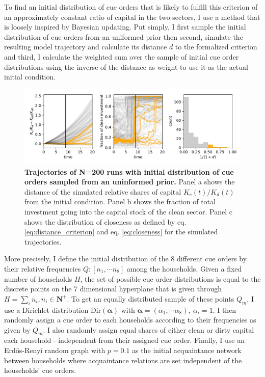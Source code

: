 To find an initial distribution of cue orders that is likely to fulfill this criterion of an approximately constant ratio of capital in the two sectors, I use a method that is loosely inspired by Bayesian updating. Put simply, I first sample the initial distribution of cue orders from an uniformed prior then second, simulate the resulting model trajectory and calculate its distance $d$ to the formalized criterion and third, I calculate the weighted sum over the sample of initial cue order distributions using the inverse of the distance as weight to use it as the actual initial condition.\\


\begin{figure}[t]
  \centering
  \includegraphics[width= \textwidth]{figures/initial_condition_sampling.pdf}
  \caption{\textbf{Trajectories of N=200 runs with initial distribution of cue orders sampled from an uninformed prior.} Panel a shows the distance of the simulated relative shares of capital $K_c(t)/K_d(t)$ from the initial condition. Panel b shows the fraction of total investment going into the capital stock of the clean sector. Panel c shows the distribution of closeness as defined by eq. \ref{eq:distance_criterion} and eq. \ref{eq:closeness} for the simulated trajectories.}
  \label{fig:initial_conditions_sampled}
\end{figure}

More precisely, I define the initial distribution of the 8 different cue orders by their relative frequencies $Q: [n_1, \cdots n_8]$ among the households. Given a fixed number of households $H$, the set of possible cue order distributions is equal to the discrete points on the 7 dimensional hyperplane that is given through $H = \sum_i n_i, n_i \in \mathbf{N^{+}}$. To get an equally distributed sample of these points $Q_m$, I use a Dirichlet distribution $\mathrm{Dir}(\mathbf{\alpha})$ with $\mathbf{\alpha}=(\alpha_1, \cdots \alpha_8), ~ \alpha_i=1$. I then randomly assign a cue order to each households according to their frequencies as given by $Q_m$. I also randomly assign equal shares of either clean or dirty capital each household - independent from their assigned cue order. Finally, I use an Erd\H{o}s-Renyi random graph with $p=0.1$ as the initial acquaintance network between households where acquaintance relations are set independent of the households' cue orders.\\


